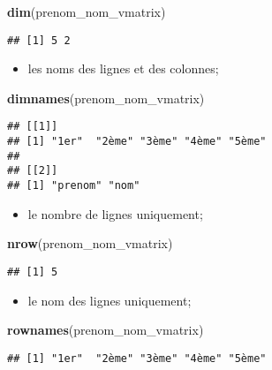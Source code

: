 \documentclass[]{book}
\newenvironment{Shaded}{\begin{snugshade}}{\end{snugshade}}
\newcommand{\KeywordTok}[1]{\textcolor[rgb]{0.13,0.29,0.53}{\textbf{#1}}}
\newcommand{\NormalTok}[1]{#1}
\providecommand{\tightlist}{%
  \setlength{\itemsep}{0pt}\setlength{\parskip}{0pt}}
\begin{document}
\begin{Shaded}
\begin{Highlighting}[]
\KeywordTok{dim}\NormalTok{(prenom_nom_vmatrix)}
\end{Highlighting}
\end{Shaded}

\begin{verbatim}
## [1] 5 2
\end{verbatim}

\begin{itemize}
\tightlist
\item
  les noms des lignes et des colonnes;
\end{itemize}

\begin{Shaded}
\begin{Highlighting}[]
\KeywordTok{dimnames}\NormalTok{(prenom_nom_vmatrix)}
\end{Highlighting}
\end{Shaded}

\begin{verbatim}
## [[1]]
## [1] "1er"  "2ème" "3ème" "4ème" "5ème"
## 
## [[2]]
## [1] "prenom" "nom"
\end{verbatim}

\begin{itemize}
\tightlist
\item
  le nombre de lignes uniquement;
\end{itemize}

\begin{Shaded}
\begin{Highlighting}[]
\KeywordTok{nrow}\NormalTok{(prenom_nom_vmatrix)}
\end{Highlighting}
\end{Shaded}

\begin{verbatim}
## [1] 5
\end{verbatim}

\begin{itemize}
\tightlist
\item
  le nom des lignes uniquement;
\end{itemize}

\begin{Shaded}
\begin{Highlighting}[]
\KeywordTok{rownames}\NormalTok{(prenom_nom_vmatrix)}
\end{Highlighting}
\end{Shaded}

\begin{verbatim}
## [1] "1er"  "2ème" "3ème" "4ème" "5ème"
\end{verbatim}
\end{document}
